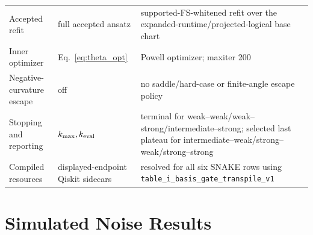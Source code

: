 \documentclass[
  reprint,
  amsmath,
  amssymb,
  aps,
  pra,
  nofootinbib,
  superscriptaddress,
  floatfix
]{revtex4-2}
\begin{document}
\begin{table}[t]
{\begin{tabular}{@{}p{}p{}p{}@{}}
Accepted refit & full accepted ansatz & supported-FS-whitened refit over the expanded-runtime/projected-logical base chart \\
Inner optimizer & Eq.~\eqref{eq:theta_opt} & Powell optimizer; maxiter 200 \\
Negative-curvature escape & off & no saddle/hard-case or finite-angle escape policy \\
Stopping and reporting & \(k_{\max},k_{\rm eval}\) & terminal for weak--weak/weak--strong/intermediate--strong; selected last plateau for intermediate--weak/strong--weak/strong--strong \\
Compiled resources & displayed-endpoint Qiskit sidecars & resolved for all six SNAKE rows using \texttt{table\_i\_basis\_gate\_transpile\_v1} \\
\bottomrule
\end{tabular}%
}
\end{table}

\section{Simulated Noise Results}
\label{app:noise_selection_robustness}
\label{app:finite_shot_score_robustness}
\end{document}
